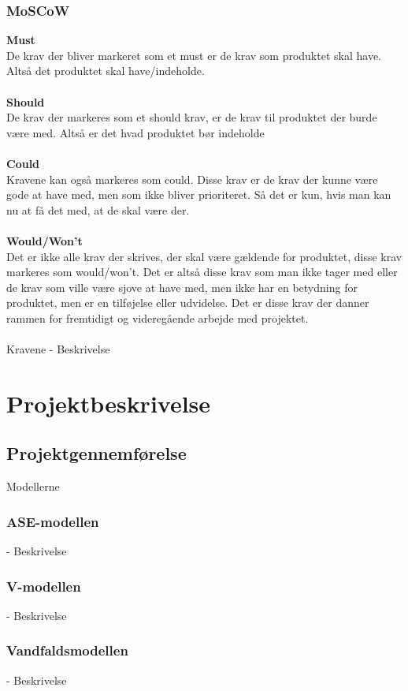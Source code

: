\subsection{MoSCoW}
\textbf{Must}\\
De krav der bliver markeret som et must er de krav som produktet skal have. Altså det produktet skal have/indeholde.\\\\
\textbf{Should}\\
De krav der markeres som et should krav, er de krav til produktet der burde være med. Altså er det hvad produktet bør indeholde\\\\
\textbf{Could}\\
Kravene kan også markeres som could. Disse krav er de krav der kunne være gode at have med, men som ikke bliver prioriteret. Så det er kun, hvis man kan nu at få det med, at de skal være der.\\\\
\textbf{Would/Won't}\\
Det er ikke alle krav der skrives, der skal være gældende for produktet, disse krav markeres som would/won't. Det er altså disse krav som man ikke tager med eller de krav som ville være sjove at have med, men ikke har en betydning for produktet, men er en tilføjelse eller udvidelse. Det er disse krav der danner rammen for fremtidigt og videregående arbejde med projektet.\\\\

Kravene
- Beskrivelse
\chapter{Projektbeskrivelse}
\section{Projektgennemførelse}
Modellerne
\subsection{ASE-modellen}
- Beskrivelse
\subsection{V-modellen}
- Beskrivelse
\subsection{Vandfaldsmodellen}
- Beskrivelse

